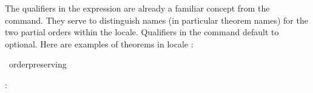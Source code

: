 \begin{isabellebody}
\begin{isamarkuptext}
  The qualifiers in the expression are already a familiar concept from
  the  command.  They serve to distinguish
  names (in particular theorem names) for the two partial orders
  within the locale.  Qualifiers in the  command
  default to optional.  Here are examples of theorems in locale :%
\end{isamarkuptext}%
\isamarkuptrue%
%
\isadeliminvisible
%
\endisadeliminvisible
%
\isataginvisible
{}\isamarkupfalse%
\ order{\isacharunderscore}preserving\ %
\endisataginvisible
{\isafoldinvisible}%
%
\isadeliminvisible
%
\endisadeliminvisible
%
\begin{isamarkuptext}%
: 


\end{isamarkuptext}
\end{isabellebody}
